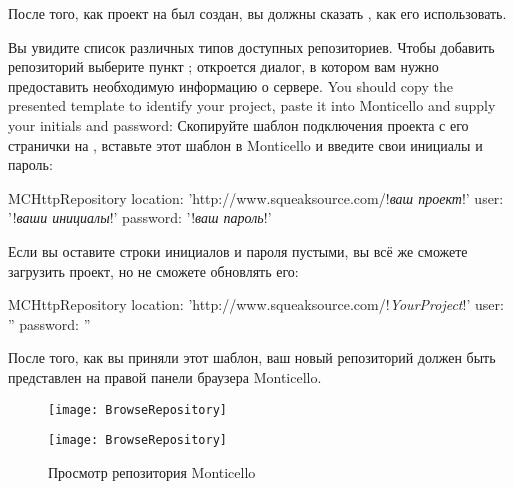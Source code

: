 \documentclass[a4paper,10pt,twoside]{book}
\begin{document}
После того, как проект на \sqsrc был создан, вы должны сказать \pharo, как его использовать.

 Вы увидите список различных типов доступных репозиториев. Чтобы добавить репозиторий \sqsrc выберите пункт ; откроется диалог, в котором вам нужно предоставить необходимую информацию о сервере.
You should copy the presented template to identify your \sqsrc project, paste it into Monticello and supply your initials and password:
Скопируйте шаблон подключения проекта с его странички на \sqsrc, вставьте этот шаблон в Monticello и введите свои инициалы и пароль:

\begin{code}{}
MCHttpRepository 
    location: 'http://www.squeaksource.com/!\emph{ваш проект}!'
    user: '!\emph{ваши инициалы}!' 
    password: '!\emph{ваш пароль}!'
\end{code}   

\noindent
Если вы оставите строки инициалов и пароля пустыми, вы всё же сможете загрузить проект, но не сможете обновлять его:

\begin{code}{}
MCHttpRepository 
    location: 'http://www.squeaksource.com/!\emph{YourProject}!'
    user: '' 
    password: ''
\end{code}   

После того, как вы приняли этот шаблон, ваш новый репозиторий должен быть представлен на правой панели браузера Monticello.

\begin{figure}[hbt]
\ifluluelse
	{\centerline {\texttt{[image: BrowseRepository]}}}
	{\centerline {\texttt{[image: BrowseRepository]}}}
\caption{Просмотр репозитория Monticello
}
\end{figure}
\end{document}
